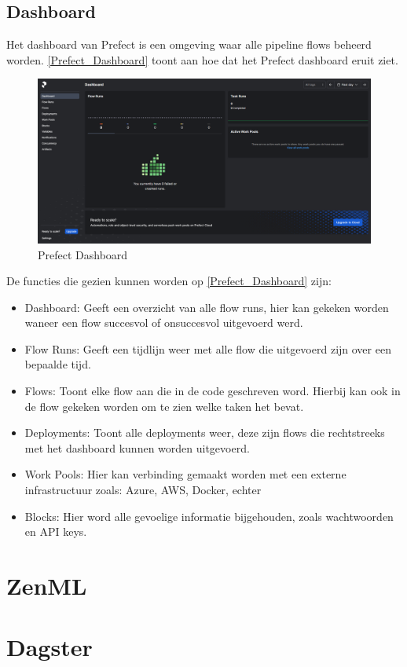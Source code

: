 \subsection{Dashboard}
Het dashboard van Prefect is een omgeving waar alle pipeline flows beheerd worden. \ref{Prefect_Dashboard} toont aan hoe dat het Prefect dashboard eruit ziet.
\begin{figure}[h]
    \includegraphics[width=\linewidth]{graphics/Prefect_dashboard.PNG}
    \caption{Prefect Dashboard}
    \label{fig:Prefect_Dashboard}
\end{figure}
De functies die gezien kunnen worden op \ref{Prefect_Dashboard} zijn:
\begin{itemize}
    \item Dashboard: Geeft een overzicht van alle flow runs, hier kan gekeken worden waneer een flow succesvol of onsuccesvol uitgevoerd werd.
    \item Flow Runs: Geeft een tijdlijn weer met alle flow die uitgevoerd zijn over een bepaalde tijd.
    \item Flows: Toont elke flow aan die in de code geschreven word. Hierbij kan ook in de flow gekeken worden om te zien welke taken het bevat.
    \item Deployments: Toont alle deployments weer, deze zijn flows die rechtstreeks met het dashboard kunnen worden uitgevoerd.
    \item Work Pools: Hier kan verbinding gemaakt worden met een externe infrastructuur zoals: Azure, AWS, Docker, echter
    \item Blocks: Hier word alle gevoelige informatie bijgehouden, zoals wachtwoorden en API keys.
\end{itemize}
\section{ZenML}

\section{Dagster}



